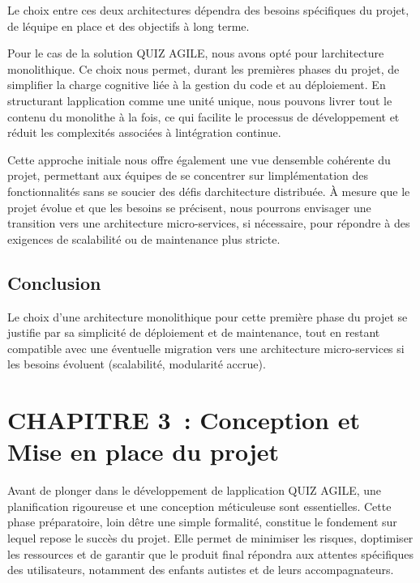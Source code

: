 \documentclass[12pt,a4paper,twoside,openright]{report}
\begin{document}
Le
choix entre ces deux architectures dépendra des besoins spécifiques du
projet, de l\textquotesingle équipe en place et des objectifs à long
terme.

Pour le cas de la solution QUIZ AGILE, nous avons opté pour
l\textquotesingle architecture monolithique. Ce choix nous permet,
durant les premières phases du projet, de simplifier la charge cognitive
liée à la gestion du code et au déploiement. En structurant
l\textquotesingle application comme une unité unique, nous pouvons
livrer tout le contenu du monolithe à la fois, ce qui facilite le
processus de développement et réduit les complexités associées à
l\textquotesingle intégration continue.

Cette approche initiale nous offre également une vue
d\textquotesingle ensemble cohérente du projet, permettant aux équipes
de se concentrer sur l\textquotesingle implémentation des
fonctionnalités sans se soucier des défis d\textquotesingle architecture
distribuée. À mesure que le projet évolue et que les besoins se
précisent, nous pourrons envisager une transition vers une architecture
micro-services, si nécessaire, pour répondre à des exigences de
scalabilité ou de maintenance plus stricte.

\hypertarget{conclusion-1}{%
\subsection{Conclusion~}\label{conclusion-1}}

Le choix d'une architecture monolithique pour cette première phase du
projet se justifie par sa simplicité de déploiement et de maintenance,
tout en restant compatible avec une éventuelle migration vers une
architecture micro-services si les besoins évoluent (scalabilité,
modularité accrue).

\hypertarget{section-3}{%
\section{}\label{section-3}}

\hypertarget{chapitre-3-conception-et-mise-en-place-du-projet}{%
\section{CHAPITRE 3~: Conception et Mise en place du
projet}\label{chapitre-3-conception-et-mise-en-place-du-projet}}

Avant de plonger dans le développement de l\textquotesingle application
QUIZ AGILE, une planification rigoureuse et une conception méticuleuse
sont essentielles. Cette phase préparatoire, loin d\textquotesingle être
une simple formalité, constitue le fondement sur lequel repose le succès
du projet. Elle permet de minimiser les risques,
d\textquotesingle optimiser les ressources et de garantir que le produit
final répondra aux attentes spécifiques des utilisateurs, notamment des
enfants autistes et de leurs accompagnateurs.
\end{document}
